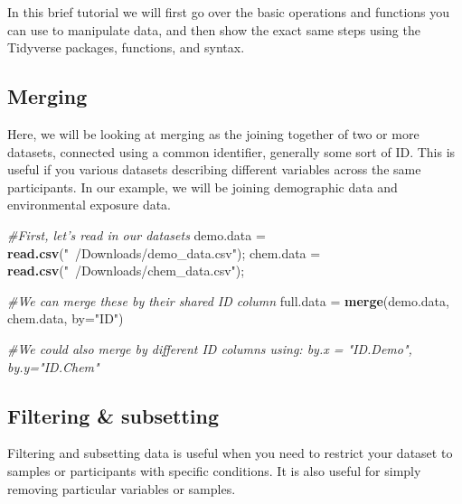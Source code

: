 \documentclass[
]{book}
\newenvironment{Shaded}{\begin{snugshade}}{\end{snugshade}}
\newcommand{\CommentTok}[1]{\textcolor[rgb]{0.56,0.35,0.01}{\textit{#1}}}
\newcommand{\DataTypeTok}[1]{\textcolor[rgb]{0.13,0.29,0.53}{#1}}
\newcommand{\KeywordTok}[1]{\textcolor[rgb]{0.13,0.29,0.53}{\textbf{#1}}}
\newcommand{\NormalTok}[1]{#1}
\newcommand{\OperatorTok}[1]{\textcolor[rgb]{0.81,0.36,0.00}{\textbf{#1}}}
\newcommand{\StringTok}[1]{\textcolor[rgb]{0.31,0.60,0.02}{#1}}
\begin{document}
In this brief tutorial we will first go over the basic operations and functions you can use to manipulate data, and then show the exact same steps using the Tidyverse packages, functions, and syntax.

\hypertarget{merging}{%
\subsection{Merging}\label{merging}}

Here, we will be looking at merging as the joining together of two or more datasets, connected using a common identifier, generally some sort of ID. This is useful if you various datasets describing different variables across the same participants. In our example, we will be joining demographic data and environmental exposure data.

\begin{Shaded}
\begin{Highlighting}[]
\CommentTok{#First, let's read in our datasets}
\NormalTok{demo.data =}\StringTok{ }\KeywordTok{read.csv}\NormalTok{(}\StringTok{"~/Downloads/demo_data.csv"}\NormalTok{);}
\NormalTok{chem.data =}\StringTok{ }\KeywordTok{read.csv}\NormalTok{(}\StringTok{"~/Downloads/chem_data.csv"}\NormalTok{);}

\CommentTok{#We can merge these by their shared ID column}
\NormalTok{full.data =}\StringTok{ }\KeywordTok{merge}\NormalTok{(demo.data, chem.data, }\DataTypeTok{by=}\StringTok{"ID"}\NormalTok{)}

\CommentTok{#We could also merge by different ID columns using: by.x = "ID.Demo", by.y="ID.Chem"}
\end{Highlighting}
\end{Shaded}

\hypertarget{filtering-subsetting}{%
\subsection{Filtering \& subsetting}\label{filtering-subsetting}}

Filtering and subsetting data is useful when you need to restrict your dataset to samples or participants with specific conditions. It is also useful for simply removing particular variables or samples.

\begin{Shaded}
\end{Shaded}
\end{document}
